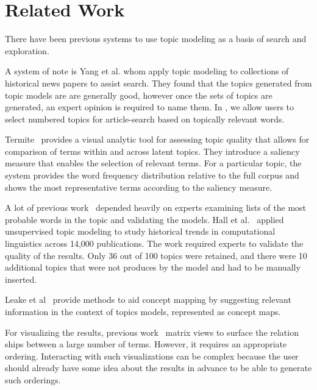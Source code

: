 \section{Related Work}

There have been previous systems to use topic modeling as a basis of
search and exploration. 

A system of note is Yang et al. \cite{yang2011topic} whom apply topic modeling to 
collections of historical news papers to assist search. They 
found that the topics generated from topic models are 
are generally good, however once the sets of topics are 
generated, an expert opinion is required to name them. 
In \system, we allow users to select numbered topics for article-search 
based on topically relevant words.



Termite~\cite{2012-termite} provides a visual analytic tool for assessing topic quality that allows for comparison of terms within and across latent topics. They introduce a saliency measure that enables the selection of relevant terms. For a particular topic, the system provides the word frequency distribution relative to the full corpus and shows the most representative terms according to the saliency measure.

A lot of previous work~\cite{chang2009reading, mimno2011optimizing, newman2010evaluating} depended heavily on experts examining lists of the most probable words in the topic and validating the models. Hall et al.~\cite{hall2008studying} applied unsupervised topic modeling to study historical trends in computational linguistics across 14,000 publications. The work required experts  to validate the quality of the results. Only 36 out of 100 topics were retained, and there were 10 additional topics that were not produces by the model and had to be manually inserted.

Leake et al~\cite{leake2003topic} provide methods to aid concept mapping by suggesting relevant information in the context of topics models, represented as concept maps. 

For visualizing the results, previous work~\cite{2012-termite, bertin1983semiology, henry2007matlink} matrix views to surface the relation ships between a large number of terms. However, it requires an appropriate ordering. Interacting with such visualizations can be complex because the user should already have some idea about the results in advance to be able to generate such orderings.











